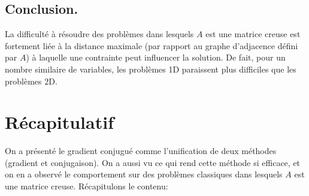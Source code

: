 \documentclass[notitlepage,oneside]{book}
\begin{document}
	

\subsection{Conclusion.}
	
La difficulté à résoudre des problèmes dans lesquels $A$ est une
matrice creuse est fortement liée à la distance maximale (par rapport
au graphe d'adjacence défini par $A$) à laquelle une contrainte peut
influencer la solution. De fait, pour un nombre similaire de
variables, les problèmes 1D paraissent plus difficiles que les problèmes 2D.
	
\section{Récapitulatif}
	
On a présenté le gradient conjugué comme l'unification de deux
méthodes (gradient et conjugaison). On a aussi vu ce qui rend cette
méthode si efficace, et on en a observé le comportement sur des
problèmes classiques dans lesquels $A$ est une matrice
creuse. Récapitulons le contenu:
	
\end{document}
